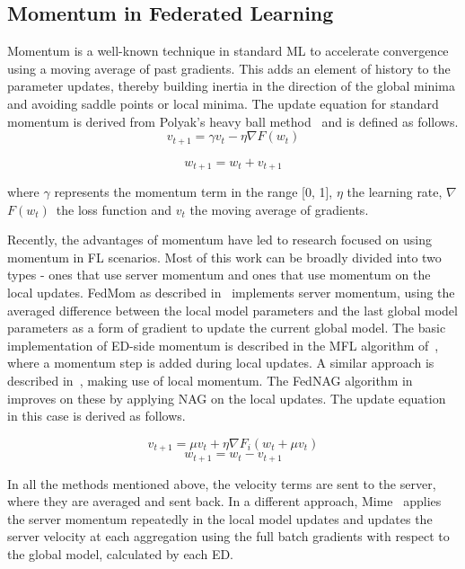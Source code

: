 \documentclass[journal]{IEEEtran}
\begin{document}
\subsection{Momentum in Federated Learning}
Momentum is a well-known technique in standard ML to accelerate convergence using a moving average of past gradients. This adds an element of history to the parameter updates, thereby building inertia in the direction of the global minima and avoiding saddle points or local minima. The update equation for standard momentum is derived from Polyak's heavy ball method~\cite{polyak1964} and is defined as follows.
\begin{equation}
v_{t+1} = \gamma v_t - \eta \nabla F(w_t)
\end{equation}

\begin{equation}
w_{t+1} = w_t + v_{t+1}
\end{equation}

where \(\gamma\) represents the momentum term in the range [0, 1], \(\eta\) the learning rate, \(\nabla\) \(F(w_t)\)\ the loss function and \(v_t\) the moving average of gradients.

Recently, the advantages of momentum have led to research focused on using momentum in FL scenarios. Most of this work can be broadly divided into two types - ones that use server momentum and ones that use momentum on the local updates. FedMom as described in~\cite{fedmom} implements server momentum, using the averaged difference between the local model parameters and the last global model parameters as a form of gradient to update the current global model. The basic implementation of ED-side momentum is described in the MFL algorithm of~\cite{mfl}, where a momentum step is added during local updates. A similar approach is described in~\cite{fedcm}, making use of local momentum. The FedNAG algorithm in~\cite{fednag} improves on these by applying NAG on the local updates. The update equation in this case is derived as follows.

\begin{equation}
v_{t+1} = \mu v_t + \eta \nabla F_i(w_t + \mu v_t)
\end{equation}
\begin{equation}
w_{t+1} = w_t - v_{t+1}
\end{equation}

In all the methods mentioned above, the velocity terms are sent to the server, where they are averaged and sent back. In a different approach, Mime~\cite{mime} applies the server momentum repeatedly in the local model updates and updates the server velocity at each aggregation using the full batch gradients with respect to the global model, calculated by each ED. 
\end{document}
